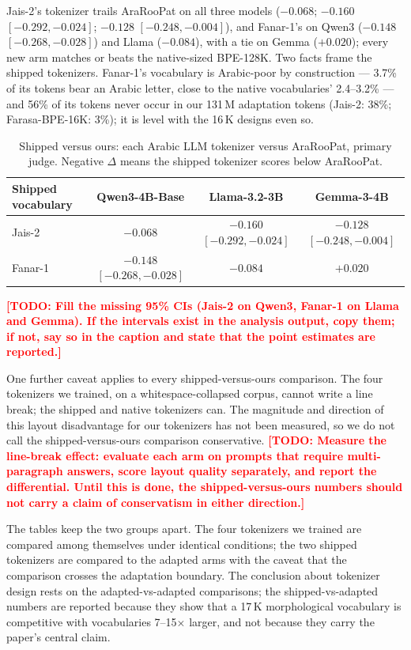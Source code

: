 \documentclass[a4paper,fleqn]{cas-sc}
\newcommand{\todo}[1]{\textcolor{red}{\textbf{[\textsc{TODO}: #1]}}}
\begin{document}
Jais-2's tokenizer trails AraRooPat on all three models ($-0.068$; $-0.160$ $[-0.292,-0.024]$; $-0.128$ $[-0.248,-0.004]$), and Fanar-1's on Qwen3 ($-0.148$ $[-0.268,-0.028]$) and Llama ($-0.084$), with a tie on Gemma ($+0.020$); every new arm matches or beats the native-sized BPE-128K. Two facts frame the shipped tokenizers. Fanar-1's vocabulary is Arabic-poor by construction --- 3.7\% of its tokens bear an Arabic letter, close to the native vocabularies' 2.4--3.2\% --- and 56\% of its tokens never occur in our 131\,M adaptation tokens (Jais-2: 38\%; Farasa-BPE-16K: 3\%); it is level with the 16\,K designs even so.

\begin{table}[t]
\centering
\caption{Shipped versus ours: each Arabic LLM tokenizer versus AraRooPat, primary judge. Negative $\Delta$ means the shipped tokenizer scores below AraRooPat.}
\label{tab:shipped-vs}
\begin{tabular}{@{}lccc@{}}
\toprule
Shipped vocabulary & Qwen3-4B-Base & Llama-3.2-3B & Gemma-3-4B \\
\midrule
Jais-2 & $-0.068$ & $-0.160$ $[-0.292,-0.024]$ & $-0.128$ $[-0.248,-0.004]$ \\
Fanar-1 & $-0.148$ $[-0.268,-0.028]$ & $-0.084$ & $+0.020$ \\
\bottomrule
\end{tabular}
\vspace{2pt}
\raggedright\footnotesize
\todo{Fill the missing 95\% CIs (Jais-2 on Qwen3, Fanar-1 on Llama and Gemma). If the intervals exist in the analysis output, copy them; if not, say so in the caption and state that the point estimates are reported.}
\end{table}

One further caveat applies to every shipped-versus-ours comparison. The four tokenizers we trained, on a whitespace-collapsed corpus, cannot write a line break; the shipped and native tokenizers can. The magnitude and direction of this layout disadvantage for our tokenizers has not been measured, so we do not call the shipped-versus-ours comparison conservative.
\todo{Measure the line-break effect: evaluate each arm on prompts that require multi-paragraph answers, score layout quality separately, and report the differential. Until this is done, the shipped-versus-ours numbers should not carry a claim of conservatism in either direction.}

The tables keep the two groups apart. The four tokenizers we trained are compared among themselves under identical conditions; the two shipped tokenizers are compared to the adapted arms with the caveat that the comparison crosses the adaptation boundary. The conclusion about tokenizer design rests on the adapted-vs-adapted comparisons; the shipped-vs-adapted numbers are reported because they show that a 17\,K morphological vocabulary is competitive with vocabularies 7--15$\times$ larger, and not because they carry the paper's central claim.
\end{document}
